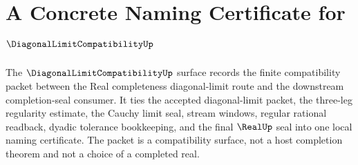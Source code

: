 \chapter{A Concrete Naming Certificate for $\DiagonalLimitCompatibilityUp$}
\label{ch:concrete-instances-diagonal-limit-compatibility-namecert}

The $\DiagonalLimitCompatibilityUp$ surface records the finite compatibility
packet between the Real completeness diagonal-limit route and the downstream
completion-seal consumer. It ties the accepted diagonal-limit packet, the
three-leg regularity estimate, the Cauchy limit seal, stream windows, regular
rational readback, dyadic tolerance bookkeeping, and the final $\RealUp$ seal
into one local naming certificate. The packet is a compatibility surface, not
a host completion theorem and not a choice of a completed real.

